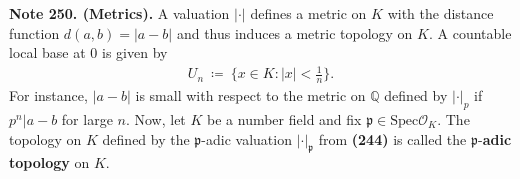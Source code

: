 \documentclass[12pt,a4paper,footinclude=true,headinclude=true]{scrbook} %
\newenvironment{nt}[2][Note]
    { \begin{mdframed}[backgroundcolor=gray!20] \textbf{#1 #2.} }
    {  \end{mdframed}}
\begin{document}
\begin{nt}{250. (Metrics)}
    \newline A valuation $|\cdot|$ defines a metric on $K$ with the distance function $d(a,b)=|a-b|$ and thus induces a metric topology on $K$. A countable local base at $0$ is given by 
    \begin{align*}
        U_n\ \coloneqq\ \{x\in K:|x|<\tfrac{1}{n}\}.
    \end{align*}
    For instance, $|a-b|$ is small with respect to the metric on $\mathbb{Q}$ defined by $|\cdot|_p$ if $p^n|a-b$ for large $n$.
    Now, let $K$ be a number field and fix $\mathfrak{p}\in\mathrm{Spec}\mathcal{O}_K$. The topology on $K$ defined by the $\mathfrak{p}$-adic valuation $|\cdot|_\mathfrak{p}$ from \textbf{(244)} is called the $\mathfrak{p}$-\textbf{adic topology} on $K$.
\end{nt}
\end{document}

